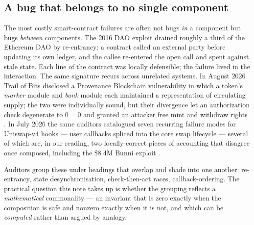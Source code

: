 \documentclass[11pt]{amsart}
\theoremstyle{definition}
\theoremstyle{remark}
\begin{document}
\subsection*{A bug that belongs to no single component}
The most costly smart-contract failures are often not bugs \emph{in} a component but bugs
\emph{between} components. The 2016 DAO exploit drained roughly a third of the Ethereum DAO by
re-entrancy: a contract called an external party before updating its own ledger, and the callee
re-entered the open call and spent against stale state. Each line of the contract was locally
defensible; the failure lived in the interaction. The same signature recurs across unrelated
systems. In August 2026 Trail of Bits disclosed a Provenance Blockchain vulnerability in which a
token's \emph{marker} module and \emph{bank} module each maintained a representation of circulating
supply; the two were individually sound, but their divergence let an authorization check degenerate
to $0=0$ and granted an attacker free mint and withdraw rights \cite{tob-statediv}. In July 2026
the same auditors catalogued seven recurring failure modes for Uniswap-v4 hooks --- user callbacks
spliced into the core swap lifecycle --- several of which are, in our reading, two locally-correct
pieces of accounting that disagree once composed, including the \$8.4M Bunni exploit
\cite{tob-uniswap}.

Auditors group these under headings that overlap and shade into one another: re-entrancy, state
desynchronisation, check-then-act races, callback-ordering. The practical question this note takes
up is whether the grouping reflects a \emph{mathematical} commonality --- an invariant that is zero
exactly when the composition is safe and nonzero exactly when it is not, and which can be
\emph{computed} rather than argued by analogy.
\end{document}
